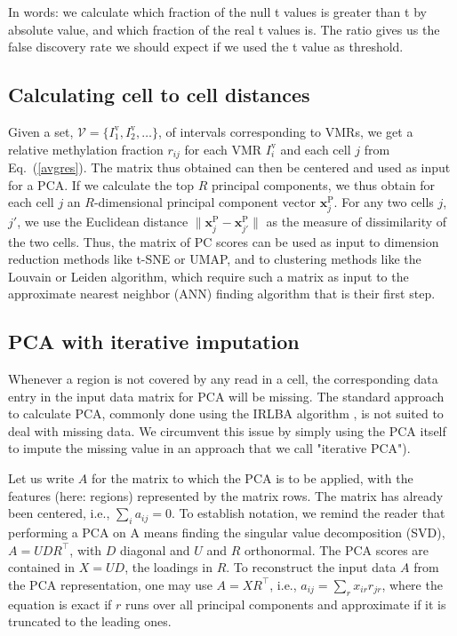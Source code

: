 \documentclass[twocolumn,10pt]{article}
\newcommand{\new}[1]{#1} %
\begin{document}
In words: we calculate which fraction of the null t values is greater than t by absolute value, and which fraction of the real t values is.
The ratio gives us the false discovery rate we should expect if we used the t value as threshold.


\subsection{Calculating cell to cell distances}

Given a set, $\mathcal{V}=\{I^\text{v}_1,I^\text{v}_2,\dots\}$, of intervals corresponding to VMRs, we get a relative methylation fraction $r_{ij}$ for each VMR $I^\text{v}_i$ and each cell $j$ from Eq.\ (\ref{avgres}).
The matrix thus obtained can then be centered and used as input for a PCA.
If we calculate the top $R$ principal components, we thus obtain for each cell $j$ an $R$-dimensional principal component vector $\mathbf{x}^\text{P}_j$.
For any two cells $j$, $j'$, we use the Euclidean distance $\|\mathbf{x}^\text{P}_j - \mathbf{x}^\text{P}_{j'}\|$ as the measure of dissimilarity of the two cells.
Thus, the matrix of PC scores can be used as input to dimension reduction methods like t-SNE or UMAP, and to clustering methods like the Louvain or Leiden algorithm, which require such a matrix as input to the approximate nearest neighbor (ANN) finding algorithm that is their first step.

\subsection{PCA with iterative imputation}

Whenever a region is not covered by any read in a cell, the corresponding data entry in the input data matrix for PCA will be missing.
The standard approach to calculate PCA, commonly done using the IRLBA algorithm \citep{Baglama2005}, is not suited to deal with missing data.
We circumvent this issue by simply using the PCA itself to impute the missing value \new{in an approach that we call "iterative PCA").}

Let us write $A$ for the matrix to which the PCA is to be applied, with the features (here: regions) represented by the matrix rows.
The matrix has already been centered, i.e., $\sum_i a_{ij}=0$.
To establish notation, we remind the reader that performing a PCA on A means finding the singular value decomposition (SVD), $A=UDR^\top$, with $D$ diagonal and $U$ and $R$ orthonormal.
The PCA scores are contained in $X=UD$, the loadings in $R$.
To reconstruct the input data $A$ from the PCA representation, one may use $A=XR^\top$, i.e., $a_{ij}=\sum_r x_{ir} r_{jr}$, where the equation is exact if $r$ runs over all principal components and approximate if it is truncated to the leading ones.
\end{document}
